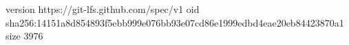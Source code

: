 version https://git-lfs.github.com/spec/v1
oid sha256:14151a8d854893f5ebb999e076bb93e07cd86e1999edbd4eae20eb84423870a1
size 3976
